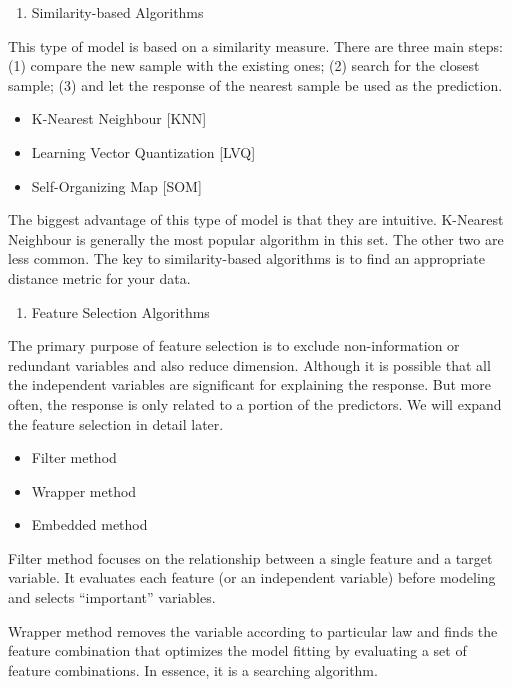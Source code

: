 \documentclass[12pt,]{krantz}
\providecommand{\tightlist}{%
  \setlength{\itemsep}{0pt}\setlength{\parskip}{0pt}}
\theoremstyle{definition}
\theoremstyle{definition}
\theoremstyle{definition}
\theoremstyle{remark}
\begin{document}
\begin{enumerate}
\def\labelenumi{\arabic{enumi}.}
\setcounter{enumi}{1}
\tightlist
\item
  Similarity-based Algorithms
\end{enumerate}

This type of model is based on a similarity measure. There are three
main steps: (1) compare the new sample with the existing ones; (2)
search for the closest sample; (3) and let the response of the nearest
sample be used as the prediction.

\begin{itemize}
\tightlist
\item
  K-Nearest Neighbour {[}KNN{]}
\item
  Learning Vector Quantization {[}LVQ{]}
\item
  Self-Organizing Map {[}SOM{]}
\end{itemize}

The biggest advantage of this type of model is that they are intuitive.
K-Nearest Neighbour is generally the most popular algorithm in this set.
The other two are less common. The key to similarity-based algorithms is
to find an appropriate distance metric for your data.

\begin{enumerate}
\def\labelenumi{\arabic{enumi}.}
\setcounter{enumi}{2}
\tightlist
\item
  Feature Selection Algorithms
\end{enumerate}

The primary purpose of feature selection is to exclude non-information
or redundant variables and also reduce dimension. Although it is
possible that all the independent variables are significant for
explaining the response. But more often, the response is only related to
a portion of the predictors. We will expand the feature selection in
detail later.

\begin{itemize}
\tightlist
\item
  Filter method
\item
  Wrapper method
\item
  Embedded method
\end{itemize}

Filter method focuses on the relationship between a single feature and a
target variable. It evaluates each feature (or an independent variable)
before modeling and selects ``important'' variables.

Wrapper method removes the variable according to particular law and
finds the feature combination that optimizes the model fitting by
evaluating a set of feature combinations. In essence, it is a searching
algorithm.
\end{document}
